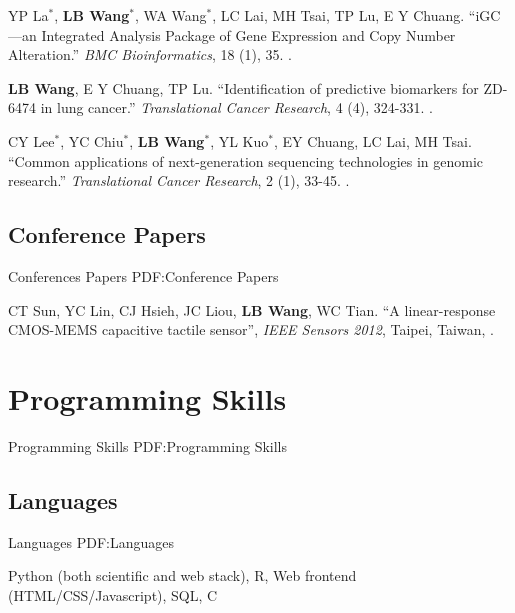 \documentclass[a4paper,12pt,oneside]{article}
\begin{document}
\begin{body}
\begin{publication}[series=pub, widest*=100]
    \item
        YP La$^*$, \textbf{LB Wang}$^*$, WA Wang$^*$, LC Lai, MH Tsai, TP Lu, E Y Chuang.
        ``iGC—an Integrated Analysis Package of Gene Expression and Copy Number Alteration.''
        \textit{BMC Bioinformatics}, 18 (1), 35.
        .

    \item
        \textbf{LB Wang}, E Y Chuang, TP Lu.
        ``Identification of predictive biomarkers for ZD-6474 in lung cancer.''
        \textit{Translational Cancer Research}, 4 (4), 324-331.
        .

    \item
        CY Lee$^*$, YC Chiu$^*$, \textbf{LB Wang}$^*$, YL Kuo$^*$, EY  Chuang, LC Lai, MH Tsai.
        ``Common applications of next-generation sequencing technologies in genomic research.''
        \textit{Translational Cancer Research}, 2 (1), 33-45.
        .
\end{publication}

\BigEntryGap
\subsection{Conference Papers}
{Conferences Papers}
{PDF:Conference Papers}

\begin{publication}[widest*=100]  %

    \item
        CT Sun, YC Lin, CJ Hsieh, JC Liou, \textbf{LB Wang}, WC Tian.
        ``A linear-response CMOS-MEMS capacitive tactile sensor'',
        \textit{IEEE Sensors 2012},
        Taipei, Taiwan,
        .

\end{publication}



\section{Programming Skills}
{Programming Skills}
{PDF:Programming Skills}

\subsection{Languages}
{Languages}
{PDF:Languages}

Python (both scientific and web stack),
R,
Web frontend (HTML/CSS/Javascript),
SQL,
C


\end{body}
\end{document}
